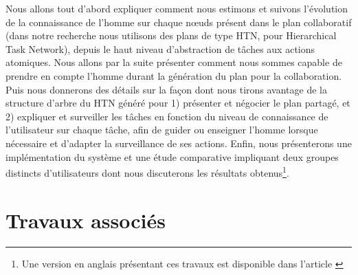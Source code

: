 \documentclass[a4paper,11pt,twoside]{StyleThese}
\begin{document}
Nous allons tout d'abord expliquer comment nous estimons et suivons l'évolution de la connaissance de l'homme sur chaque nœuds présent dans le plan collaboratif (dans notre recherche nous utilisons des plans de type HTN, pour Hierarchical Task Network), depuis le haut niveau d'abstraction de tâches aux actions atomiques. Nous allons par la suite présenter comment nous sommes capable de prendre en compte l'homme durant la génération du plan pour la collaboration. Puis nous donnerons des détails sur la façon dont nous tirons avantage de la structure d'arbre du HTN généré pour 1) présenter et négocier le plan partagé,
et 2) expliquer et surveiller les tâches en fonction du niveau de connaissance de l'utilisateur sur chaque tâche, afin de guider ou enseigner l'homme lorsque nécessaire et d'adapter la surveillance de ses actions. Enfin, nous présenterons une implémentation du système et une étude comparative impliquant deux groupes distincts d'utilisateurs dont nous discuterons les résultats obtenus\footnote{Une version en anglais présentant ces travaux est disponible dans l'article \cite{Milliez16}}.





\section{Travaux associés}



\end{document}
